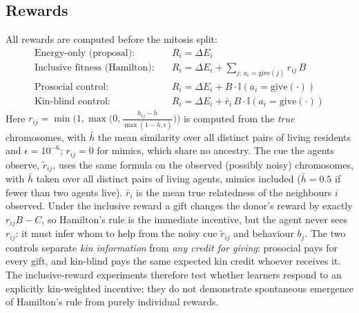 \documentclass{article}
\begin{document}
\subsection{Rewards}
\label{sec:reward}
All rewards are computed before the mitosis split:
\begin{align}
\text{Energy-only (proposal):}\quad & R_i = \Delta E_i\\
\text{Inclusive fitness (Hamilton):}\quad & R_i = \Delta E_i + \textstyle\sum_{j:\,a_i=\text{give}(j)} r_{ij}\,B\\
\text{Prosocial control:}\quad & R_i = \Delta E_i + B\cdot\mathbb{I}(a_i=\text{give}(\cdot))\\
\text{Kin-blind control:}\quad & R_i = \Delta E_i + \bar r_i\, B\cdot\mathbb{I}(a_i=\text{give}(\cdot))
\end{align}
Here $r_{ij}=\min\!\big(1,\max\!\big(0,\frac{h_{ij}-\bar h}{\max(1-\bar h,\epsilon)}\big)\big)$ is computed from the \emph{true} chromosomes, with $\bar h$ the mean similarity over all distinct pairs of living residents and $\epsilon=10^{-6}$; $r_{ij}=0$ for mimics, which share no ancestry. The cue the agents observe, $\tilde r_{ij}$, uses the same formula on the observed (possibly noisy) chromosomes, with $\bar h$ taken over all distinct pairs of living agents, mimics included ($\bar h=0.5$ if fewer than two agents live). $\bar r_i$ is the mean true relatedness of the neighbours $i$ observed. Under the inclusive reward a gift changes the donor's reward by exactly $r_{ij}B-C$, so Hamilton's rule is the immediate incentive, but the agent never sees $r_{ij}$: it must infer whom to help from the noisy cue $\tilde r_{ij}$ and behaviour $b_j$. The two controls separate \emph{kin information} from \emph{any credit for giving}: prosocial pays for every gift, and kin-blind pays the same expected kin credit whoever receives it. The inclusive-reward experiments therefore test whether learners respond to an explicitly kin-weighted incentive; they do not demonstrate spontaneous emergence of Hamilton's rule from purely individual rewards.
\end{document}
